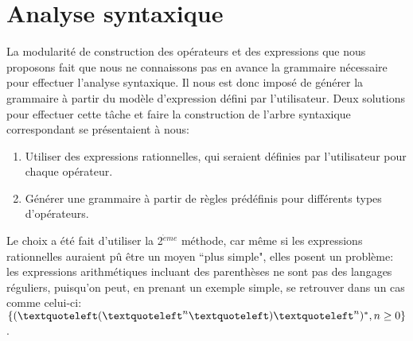 \documentclass{article}
\begin{document}
\section{Analyse syntaxique}
La modularité de construction des opérateurs et des expressions que nous proposons fait que nous ne connaissons pas en avance la grammaire nécessaire pour effectuer l'analyse syntaxique. Il nous est donc imposé de générer la grammaire à partir du modèle d'expression défini par l'utilisateur.
Deux solutions pour effectuer cette tâche et faire la construction de l'arbre syntaxique correspondant se présentaient à nous:
\begin{enumerate}
	\item Utiliser des expressions rationnelles, qui seraient définies par l'utilisateur pour chaque opérateur.
	\item Générer une grammaire à partir de règles prédéfinis pour différents types d'opérateurs.
\end{enumerate}
Le choix a été fait d'utiliser la 2$^{\grave{e}me}$ méthode, car même si les expressions rationnelles auraient pû être un moyen ``plus simple", elles posent un problème: les expressions arithmétiques incluant des parenthèses ne sont pas des langages réguliers, puisqu'on peut, en prenant un exemple simple, se retrouver dans un cas comme celui-ci: $\{(\textquoteleft(\textquoteleft^{n}\textquoteleft)\textquoteleft^{n})^{*}, n \ge 0 \}$.
\end{document}
